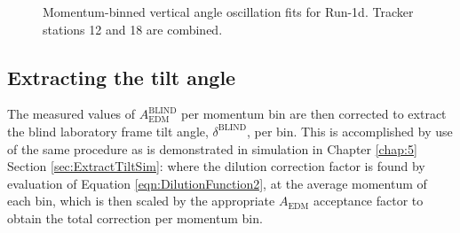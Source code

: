 \begin{figure}[]
\caption{Momentum-binned vertical angle oscillation fits for Run-1d. Tracker stations 12 and 18 are combined.}
\label{fig:Run1dMomBinnedFits}
\end{figure}
\clearpage

\subsection{Extracting the tilt angle}\label{sec:ExtractTiltData}

The measured values of $A_{\text{EDM}}^{\text{BLIND}}$ per momentum bin are then corrected to extract the blind laboratory frame tilt angle, $\delta^{\text{BLIND}}$, per bin. This is accomplished by use of the same procedure as is demonstrated in simulation in Chapter \ref{chap:5} Section \ref{sec:ExtractTiltSim}: where the dilution correction factor is found by evaluation of Equation \ref{eqn:DilutionFunction2}, at the average momentum of each bin, which is then scaled by the appropriate $A_{\text{EDM}}$ acceptance factor to obtain the total correction per momentum bin. %

